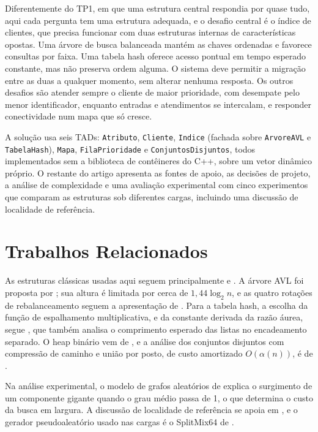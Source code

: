 \documentclass[letterpaper]{article} %
\begin{document}
Diferentemente do TP1, em que uma estrutura central respondia por quase tudo, aqui cada pergunta tem uma estrutura adequada, e o desafio central \'e o \'indice de clientes, que precisa funcionar com duas estruturas internas de caracter\'isticas opostas. Uma \'arvore de busca balanceada mant\'em as chaves ordenadas e favorece consultas por faixa. Uma tabela hash oferece acesso pontual em tempo esperado constante, mas n\~ao preserva ordem alguma. O sistema deve permitir a migra\c{c}\~ao entre as duas a qualquer momento, sem alterar nenhuma resposta. Os outros desafios s\~ao atender sempre o cliente de maior prioridade, com desempate pelo menor identificador, enquanto entradas e atendimentos se intercalam, e responder conectividade num mapa que s\'o cresce.

A solu\c{c}\~ao usa seis TADs: \texttt{Atributo}, \texttt{Cliente}, \texttt{Indice} (fachada sobre \texttt{ArvoreAVL} e \texttt{TabelaHash}), \texttt{Mapa}, \texttt{FilaPrioridade} e \texttt{ConjuntosDisjuntos}, todos implementados sem a biblioteca de cont\^eineres do C++, sobre um vetor din\^amico pr\'oprio. O restante do artigo apresenta as fontes de apoio, as decis\~oes de projeto, a an\'alise de complexidade e uma avalia\c{c}\~ao experimental com cinco experimentos que comparam as estruturas sob diferentes cargas, incluindo uma discuss\~ao de localidade de refer\^encia.

\section{Trabalhos Relacionados}

As estruturas cl\'assicas usadas aqui seguem principalmente \citet{cormen2009} e \citet{ziviani2011}. A \'arvore AVL foi proposta por \citet{adelson1962}; sua altura \'e limitada por cerca de $1{,}44\log_2 n$, e as quatro rota\c{c}\~oes de rebalanceamento seguem a apresenta\c{c}\~ao de \citet{ziviani2011}. Para a tabela hash, a escolha da fun\c{c}\~ao de espalhamento multiplicativa, e da constante derivada da raz\~ao \'aurea, segue \citet[Se\c{c}.~6.4]{knuth1998}, que tamb\'em analisa o comprimento esperado das listas no encadeamento separado. O heap bin\'ario vem de \citet{williams1964}, e a an\'alise dos conjuntos disjuntos com compress\~ao de caminho e uni\~ao por posto, de custo amortizado $O(\alpha(n))$, \'e de \citet{tarjan1975}.

Na an\'alise experimental, o modelo de grafos aleat\'orios de \citet{erdos1960} explica o surgimento de um componente gigante quando o grau m\'edio passa de 1, o que determina o custo da busca em largura. A discuss\~ao de localidade de refer\^encia se apoia em \citet{drepper2007}, e o gerador pseudoaleat\'orio usado nas cargas \'e o SplitMix64 de \citet{steele2014}.
\end{document}
